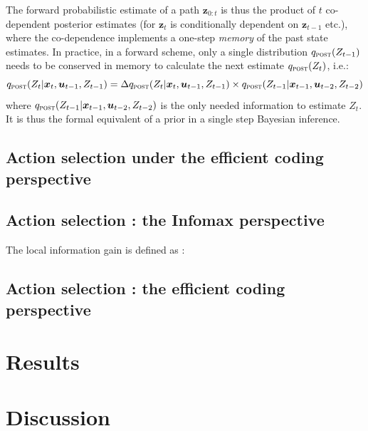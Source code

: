 \documentclass[12pt,twoside,openright]{article}
\begin{document}
The forward probabilistic estimate of a path $\boldsymbol{z}_{0:t}$ is thus the product of $t$ co-dependent posterior estimates (for $\boldsymbol{z}_t$ is conditionally dependent on $\boldsymbol{z}_{t-1}$ etc.), where the co-dependence implements a one-step \emph{memory} of the past state estimates. In practice, in a forward scheme, only a single distribution $q_\text{\sc post}(Z_{t-1})$ needs to be conserved in memory to calculate the next estimate $q_\text{\sc post}(Z_t)$, i.e.:
$$q_\text{\sc post}(Z_t|\boldsymbol{x}_t,\boldsymbol{u}_{t-1}, Z_{t-1}) = 
\Delta q_\text{\sc post}(Z_t|\boldsymbol{x}_t,\boldsymbol{u}_{t-1}, Z_{t-1}) 
\times q_\text{\sc post}(Z_{t-1}|\boldsymbol{x}_{t-1},\boldsymbol{u}_{t-2}, Z_{t-2})$$
where $q_\text{\sc post}(Z_{t-1}|\boldsymbol{x}_{t-1},\boldsymbol{u}_{t-2}, Z_{t-2})$ is the only needed information to estimate $Z_t$. It is thus the formal equivalent of a prior in a single step Bayesian inference.

\subsection{Action selection under the efficient coding perspective}


\subsection{Action selection : the Infomax perspective}

The local information gain is defined as :


\subsection{Action selection : the efficient coding perspective}

\section{Results} \label{sec:results}

\section{Discussion}



\end{document}
